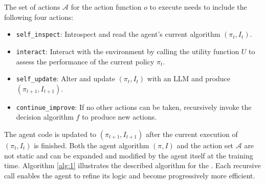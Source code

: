 The set of actions $\mathcal{A}$ for the action function $o$ to execute needs to include the following four actions: 
\begin{itemize}[leftmargin=*,itemsep=1pt]
    \item \texttt{self\_inspect}: Introspect and read the agent's current algorithm $(\pi_t, I_t)$.
    \item \texttt{interact}: Interact with the environment by calling the utility function $U$ to assess the performance of the current policy $\pi_t$. 
    \item \texttt{self\_update}: Alter and update $(\pi_t, I_t)$ with an LLM and produce $(\pi_{t+1}, I_{t+1})$.
    \item \texttt{continue\_improve}: If no other actions can be taken, recursively invoke the decision algorithm $f$ to produce new actions.
\end{itemize}
The agent code is updated to $(\pi_{t+1}, I_{t+1})$ after the current execution of $(\pi_t, I_t)$ is finished.
Both the agent algorithm $(\pi, I)$ and the action set $\mathcal{A}$ are not static and can be expanded and modified by the agent itself at the training time.
Algorithm \ref{alg:1} illustrates the described algorithm for the \framework. Each recursive call enables the agent to refine its logic and become progressively more efficient.

